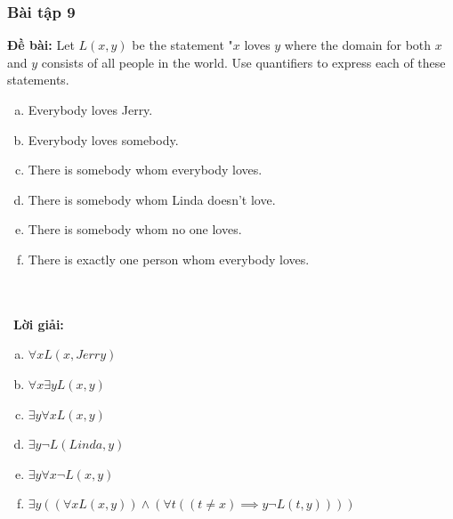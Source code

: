 \documentclass[a4paper]{article}
\begin{document}
\subsubsection{Bài tập 9}
\textbf{Đề bài:} Let $L(x,y)$ be the statement "$x$ loves $y$ where the domain for both $x$ and $y$ consists of all people in the world. Use quantifiers to express each of these statements.
\begin{enumerate}[a)]
	\item Everybody loves Jerry.
	\item Everybody loves somebody.
	\item There is somebody whom everybody loves.
	\item There is somebody whom Linda doesn't love.
	\item There is somebody whom no one loves.
	\item There is exactly one person whom everybody loves.
\end{enumerate}
\\\ \\\
\textbf{Lời giải:} \begin{enumerate}[a)]
	\item $\forall x L(x,Jerry)$
	\item $\forall x \exists y L(x,y)$
	\item $\exists y \forall x L(x,y)$
	\item $\exists y \lnot L(Linda,y)$
	\item $\exists y \forall x \lnot L(x,y)$
	\item $\exists y((\forall x L(x,y)) \land (\forall t((t \neq x) \implies y \lnot L(t,y))))$
\end{enumerate}
 \\\ \\\
\clearpage
\end{document}
